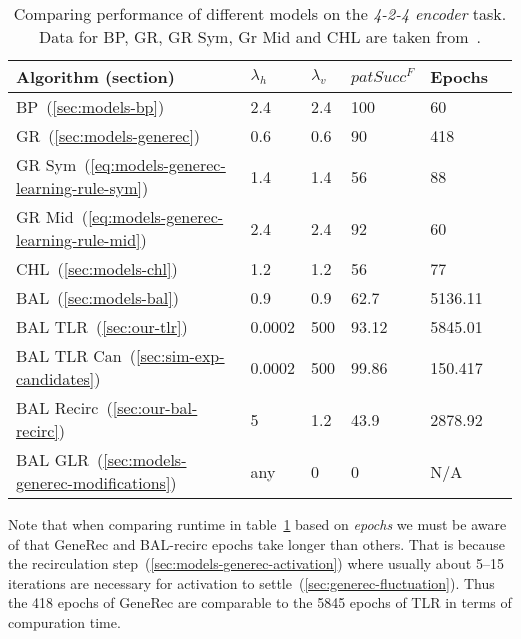 \begin{table}[H] 
  \centering
    \begin{tabular}{|l|l|l|l|l|l|}
    \hline
    Algorithm (section)&$\lambda_h$&$\lambda_v$&$patSucc^F$ &Epochs\\ %
    \hline
    BP~(\ref{sec:models-bp}) &2.4 &2.4 &100&60\\ %
    \hline
    GR~(\ref{sec:models-generec}) &0.6 &0.6 &90&418\\ %
    \hline
    GR Sym~(\ref{eq:models-generec-learning-rule-sym}) &1.4 &1.4 &56&88\\ %
    \hline
    GR Mid~(\ref{eq:models-generec-learning-rule-mid}) &2.4 &2.4 &92&60\\ %
    \hline
    CHL~(\ref{sec:models-chl}) &1.2 &1.2 &56&77\\ %
    \hline
    BAL~(\ref{sec:models-bal})&0.9 &0.9 &62.7& 5136.11\\ %
    \hline
    BAL TLR~(\ref{sec:our-tlr})&0.0002  & 500&93.12&5845.01\\ %
    \hline
    BAL TLR Can~(\ref{sec:sim-exp-candidates})&0.0002&500&99.86&150.417\\ %
    \hline
    BAL Recirc~(\ref{sec:our-bal-recirc})&5&1.2&43.9&2878.92\\ %
    \hline
    BAL GLR~(\ref{sec:models-generec-modifications})& any & 0 & 0 & N/A \\ 
    \hline 
    \end{tabular}
  \caption{Comparing performance of different models on the \emph{4-2-4 encoder} task. Data for BP, GR, GR Sym, Gr Mid and CHL are taken from~\citet{o1996bio}.} 
  \label{tab:results-cmp-auto4}
\end{table}

Note that when comparing runtime in table~\ref{tab:results-cmp-auto4} based on \emph{epochs} we must be aware of that GeneRec and BAL-recirc epochs take longer than others. That is because the recirculation step~(\ref{sec:models-generec-activation}) where usually about 5--15 iterations are necessary for activation to settle~(\ref{sec:generec-fluctuation}). Thus the 418 epochs of GeneRec are comparable to the 5845 epochs of TLR in terms of compuration time. 
